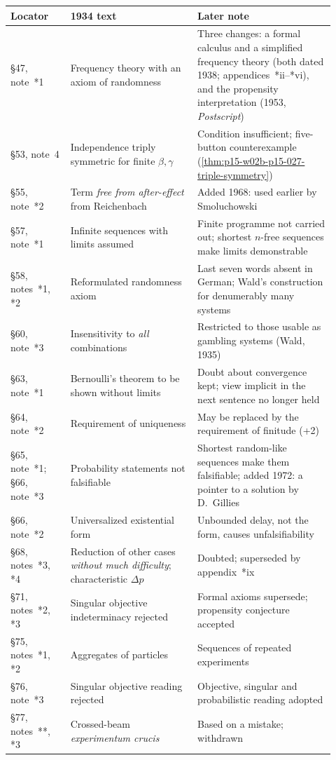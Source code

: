 \begin{center}\small
\begin{tabular}{@{}p{0.17\linewidth}p{0.36\linewidth}p{0.39\linewidth}@{}}
\toprule
Locator&1934 text&Later note\\
\midrule
\S47, note~*1&Frequency theory with an axiom of randomness&Three changes: a formal calculus and a simplified frequency theory (both dated 1938; appendices~*ii--*vi), and the propensity interpretation (1953, \emph{Postscript})\\
\S53, note~4&Independence triply symmetric for finite \(\beta,\gamma\)&Condition insufficient; five-button counterexample (\cref{thm:p15-w02b-p15-027-triple-symmetry})\\
\S55, note~*2&Term \emph{free from after-effect} from Reichenbach&Added 1968: used earlier by Smoluchowski\\
\S57, note~*1&Infinite sequences with limits assumed&Finite programme not carried out; shortest \(n\)-free sequences make limits demonstrable\\
\S58, notes~*1, *2&Reformulated randomness axiom&Last seven words absent in German; Wald's construction for denumerably many systems\\
\S60, note~*3&Insensitivity to \emph{all} combinations&Restricted to those usable as gambling systems (Wald, 1935)\\
\S63, note~*1&Bernoulli's theorem to be shown without limits&Doubt about convergence kept; view implicit in the next sentence no longer held\\
\S64, note~*2&Requirement of uniqueness&May be replaced by the requirement of finitude (+2)\\
\S65, note~*1; \S66, note~*3&Probability statements not falsifiable&Shortest random-like sequences make them falsifiable; added 1972: a pointer to a solution by D.~Gillies\\
\S66, note~*2&Universalized existential form&Unbounded delay, not the form, causes unfalsifiability\\
\S68, notes~*3, *4&Reduction of other cases \emph{without much difficulty}; characteristic \(\Delta p\)&Doubted; superseded by appendix~*ix\\
\S71, notes~*2, *3&Singular objective indeterminacy rejected&Formal axioms supersede; propensity conjecture accepted\\
\S75, notes~*1, *2&Aggregates of particles&Sequences of repeated experiments\\
\S76, note~*3&Singular objective reading rejected&Objective, singular and probabilistic reading adopted\\
\S77, notes~**, *3&Crossed-beam \emph{experimentum crucis}&Based on a mistake; withdrawn\\
\bottomrule
\end{tabular}
\end{center}

